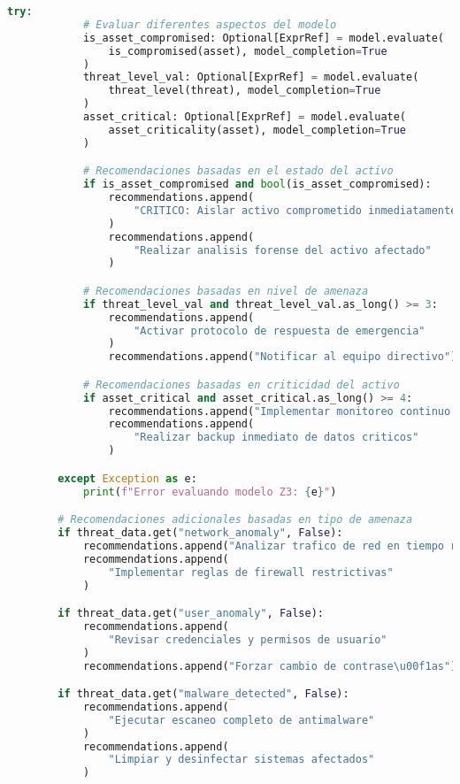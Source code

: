 \begin{lstlisting}[language=python, inputencoding=utf8]
        try:
            # Evaluar diferentes aspectos del modelo
            is_asset_compromised: Optional[ExprRef] = model.evaluate(
                is_compromised(asset), model_completion=True
            )
            threat_level_val: Optional[ExprRef] = model.evaluate(
                threat_level(threat), model_completion=True
            )
            asset_critical: Optional[ExprRef] = model.evaluate(
                asset_criticality(asset), model_completion=True
            )

            # Recomendaciones basadas en el estado del activo
            if is_asset_compromised and bool(is_asset_compromised):
                recommendations.append(
                    "CRITICO: Aislar activo comprometido inmediatamente"
                )
                recommendations.append(
                    "Realizar analisis forense del activo afectado"
                )

            # Recomendaciones basadas en nivel de amenaza
            if threat_level_val and threat_level_val.as_long() >= 3:
                recommendations.append(
                    "Activar protocolo de respuesta de emergencia"
                )
                recommendations.append("Notificar al equipo directivo")

            # Recomendaciones basadas en criticidad del activo
            if asset_critical and asset_critical.as_long() >= 4:
                recommendations.append("Implementar monitoreo continuo 24/7")
                recommendations.append(
                    "Realizar backup inmediato de datos criticos"
                )

        except Exception as e:
            print(f"Error evaluando modelo Z3: {e}")

        # Recomendaciones adicionales basadas en tipo de amenaza
        if threat_data.get("network_anomaly", False):
            recommendations.append("Analizar trafico de red en tiempo real")
            recommendations.append(
                "Implementar reglas de firewall restrictivas"
            )

        if threat_data.get("user_anomaly", False):
            recommendations.append(
                "Revisar credenciales y permisos de usuario"
            )
            recommendations.append("Forzar cambio de contrase\u00f1as")

        if threat_data.get("malware_detected", False):
            recommendations.append(
                "Ejecutar escaneo completo de antimalware"
            )
            recommendations.append(
                "Limpiar y desinfectar sistemas afectados"
            )


\end{lstlisting}
